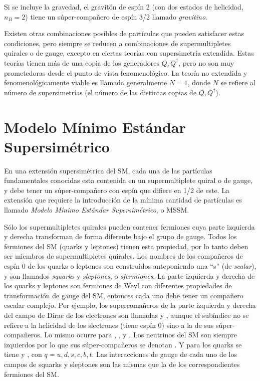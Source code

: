 Si se incluye la gravedad, el gravitón de espín 2 (con dos estados de helicidad,
$n_B=2$) tiene un súper-compañero de espín 3/2 llamado \emph{gravitino}.

Existen otras combinaciones posibles de partículas que pueden satisfacer estas
condiciones, pero siempre se reducen a combinaciones de supermultipletes
quirales o de gauge, excepto en ciertas teorías con supersimetría extendida.
Estas teorías tienen más de una copia de los generadores $Q, Q^\dagger$, pero no
son muy prometedoras desde el punto de vista fenomenológico. La teoría no
extendida y fenomenológicamente viable es llamada generalmente $N=1$, donde $N$
se refiere al número de supersimetrías (el número de las distintas copias de
$Q,Q^\dagger$).


\section{Modelo Mínimo Estándar Supersimétrico}

En una extensión supersimétrica del SM, cada una de las partículas fundamentales
conocidas esta contenida en un supermultiplete quiral o de gauge, y debe tener
un súper-compa\~nero con espín que difiere en 1/2 de este. La extensión que
requiere la introducción de la mínima cantidad de partículas es llamado
\emph{Modelo Mínimo Estándar Supersimétrico}, o MSSM.


Sólo los supermultipletes quirales pueden contener fermiones cuya parte
izquierda y derecha transforman de forma diferente bajo el grupo de gauge. Todos
los fermiones del SM (quarks y leptones) tienen esta propiedad, por lo tanto
deben ser miembros de supermultipletes quirales. Los nombres de los compañeros
de espín 0 de los quarks o leptones son construidos anteponiendo una ``s'' (de
\emph{scalar}), y son llamados \emph{squarks} y \emph{sleptones}, o
\emph{sfermiones}. La parte izquierda y derecha de los quarks y leptones son
fermiones de Weyl con diferentes propiedades de transformación de gauge del SM,
entonces cada uno debe tener un compañero escalar complejo. Por ejemplo, los
supercomañeros de la parte izquierda y derecha del campo de Dirac de los
electrones son llamadas {\selL} y {\selR}, aunque el subíndice no se refiere a
la helicidad de los slectrones (tiene espín 0) sino a la de sus súper-compañeros.
Lo mismo ocurre para {\smuL}, {\smuR}, {\stauL} y {\stauR}. Los neutrinos del SM
son siempre izquierdos por lo que sus súper-compañeros se denotan {\snu}. Y
para los quarks se tiene {\squarkL} y {\squarkR}, con $q = u, d, s, c, b, t$. Las
interacciones de gauge de cada uno de los campos de squarks y sleptones son las
mismas que la de los correspondientes fermiones del SM.

